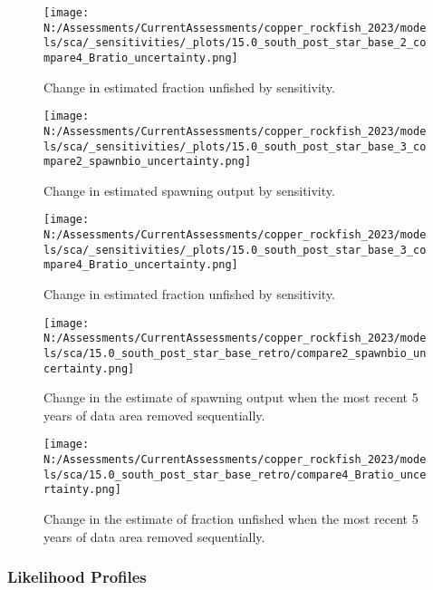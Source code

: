 \documentclass[11pt,
  english,
  letterpaper,
]{article}
\begin{document}
\newpage

\begin{figure}
\centering
\texttt{[image: N:/Assessments/CurrentAssessments/copper\_rockfish\_2023/models/sca/\_sensitivities/\_plots/15.0\_south\_post\_star\_base\_2\_compare4\_Bratio\_uncertainty.png]}
\caption{Change in estimated fraction unfished by sensitivity.\label{fig:sens-depl-2}}
\end{figure}

\newpage

\begin{figure}
\centering
\texttt{[image: N:/Assessments/CurrentAssessments/copper\_rockfish\_2023/models/sca/\_sensitivities/\_plots/15.0\_south\_post\_star\_base\_3\_compare2\_spawnbio\_uncertainty.png]}
\caption{Change in estimated spawning output by sensitivity.\label{fig:sens-ssb-3}}
\end{figure}

\newpage

\begin{figure}
\centering
\texttt{[image: N:/Assessments/CurrentAssessments/copper\_rockfish\_2023/models/sca/\_sensitivities/\_plots/15.0\_south\_post\_star\_base\_3\_compare4\_Bratio\_uncertainty.png]}
\caption{Change in estimated fraction unfished by sensitivity.\label{fig:sens-depl-3}}
\end{figure}

\newpage

\begin{figure}
\centering
\texttt{[image: N:/Assessments/CurrentAssessments/copper\_rockfish\_2023/models/sca/15.0\_south\_post\_star\_base\_retro/compare2\_spawnbio\_uncertainty.png]}
\caption{Change in the estimate of spawning output when the most recent 5 years of data area removed sequentially.\label{fig:retro-ssb}}
\end{figure}

\pagebreak

\begin{figure}
\centering
\texttt{[image: N:/Assessments/CurrentAssessments/copper\_rockfish\_2023/models/sca/15.0\_south\_post\_star\_base\_retro/compare4\_Bratio\_uncertainty.png]}
\caption{Change in the estimate of fraction unfished when the most recent 5 years of data area removed sequentially.\label{fig:retro-depl}}
\end{figure}

\hypertarget{likelihood-profiles-1}{%
\subsubsection{Likelihood Profiles}\label{likelihood-profiles-1}}
\end{document}

